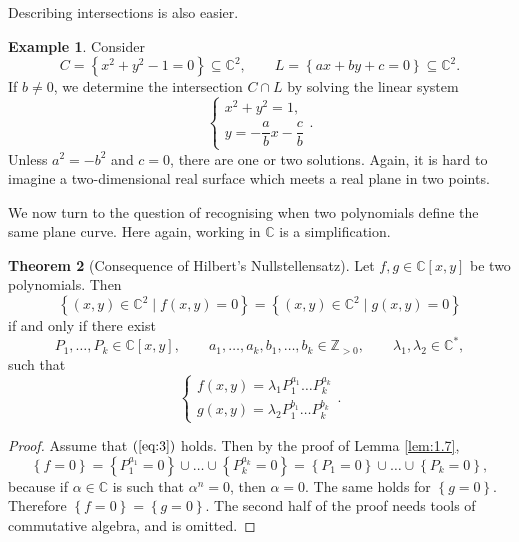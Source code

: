 \documentclass{article}
\newcommand{\Z}{\mathbb{Z}}
\newcommand{\C}{\mathbb{C}}
\newcommand{\rb}[1]{\left( #1 \right)}
\renewcommand{\sb}[1]{\left[ #1 \right]}
\newcommand{\cb}[1]{\left\{ #1 \right\}}
\theoremstyle{definition}\newtheorem{definition}{Definition}[section]
\theoremstyle{definition}\newtheorem{notation}[definition]{Notation}
\theoremstyle{definition}\newtheorem{remark}[definition]{Remark}
\theoremstyle{definition}\newtheorem{example1}[definition]{Example}
\theoremstyle{definition}\newtheorem{fact}{Fact}
\theoremstyle{definition}\newtheorem{exercise}{Exercise}
\theoremstyle{definition}\newtheorem*{example2}{Example}
\newtheorem{theorem}[definition]{Theorem}
\begin{document}
Describing intersections is also easier.

\begin{example1}
Consider
$$ C = \cb{x^2 + y^2 - 1 = 0} \subseteq \C^2, \qquad L = \cb{ax + by + c = 0} \subseteq \C^2. $$
If $ b \ne 0 $, we determine the intersection $ C \cap L $ by solving the linear system
$$ \begin{cases}
x^2 + y^2 = 1, \\
y = -\dfrac{a}{b}x - \dfrac{c}{b}
\end{cases}. $$
Unless $ a^2 = -b^2 $ and $ c = 0 $, there are one or two solutions. Again, it is hard to imagine a two-dimensional real surface which meets a real plane in two points.
\end{example1}

We now turn to the question of recognising when two polynomials define the same plane curve. Here again, working in $ \C $ is a simplification.

\begin{theorem}[Consequence of Hilbert's Nullstellensatz]
\label{thm:2.10}
Let $ f, g \in \C\sb{x, y} $ be two polynomials. Then
$$ \cb{\rb{x, y} \in \C^2 \mid f\rb{x, y} = 0} = \cb{\rb{x, y} \in \C^2 \mid g\rb{x, y} = 0} $$
if and only if there exist
$$ P_1, \dots, P_k \in \C\sb{x, y}, \qquad a_1, \dots, a_k, b_1, \dots, b_k \in \Z_{> 0}, \qquad \lambda_1, \lambda_2 \in \C^*, $$
such that
\begin{equation}
\label{eq:3}
\begin{cases}
f\rb{x, y} = \lambda_1 P_1^{a_1} \dots P_k^{a_k} \\
g\rb{x, y} = \lambda_2 P_1^{b_1} \dots P_k^{b_k}
\end{cases}.
\end{equation}
\end{theorem}


\begin{proof}
Assume that $ \rb{\ref{eq:3}} $ holds. Then by the proof of Lemma \ref{lem:1.7},
$$ \cb{f = 0} = \cb{P_1^{a_1} = 0} \cup \dots \cup \cb{P_k^{a_k} = 0} = \cb{P_1 = 0} \cup \dots \cup \cb{P_k = 0}, $$
because if $ \alpha \in \C $ is such that $ \alpha^n = 0 $, then $ \alpha = 0 $. The same holds for $ \cb{g = 0} $. Therefore $ \cb{f = 0} = \cb{g = 0} $. The second half of the proof needs tools of commutative algebra, and is omitted.
\end{proof}
\end{document}
